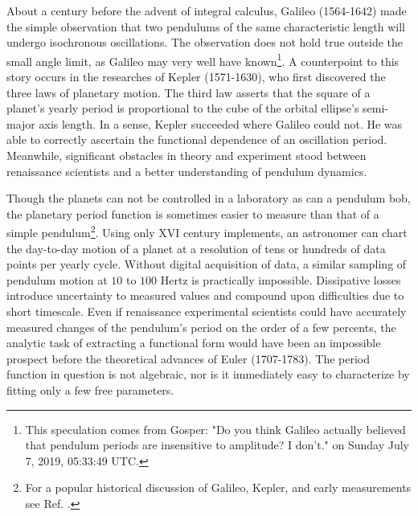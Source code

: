 \documentclass[nofootinbib,preprint]{revtex4-1}
\begin{document}
About a century before the advent of 
integral calculus, Galileo (1564-1642) made the simple observation that two 
pendulums of the same characteristic length will undergo isochronous 
oscillations. The observation does not hold true outside the small angle limit, 
as Galileo may very well have known\footnote{This speculation comes from Gosper:
"Do you think Galileo actually believed that pendulum periods are insensitive to 
amplitude?  I don't." on Sunday July 7, 2019, 05:33:49 UTC.}. A counterpoint to this 
story occurs in the researches of Kepler (1571-1630), who first discovered the three 
laws of planetary motion. The third law asserts that the square of a planet's yearly 
period is proportional to the cube of the orbital ellipse's semi-major axis length. 
In a sense, Kepler succeeded where Galileo could not. He was able to correctly 
ascertain the functional dependence of an oscillation period. Meanwhile, significant 
obstacles in theory and experiment stood between renaissance scientists and a better 
understanding of pendulum dynamics.  

Though the planets can not be controlled in a laboratory as can a pendulum bob, the 
planetary period function is sometimes easier to measure than that of a simple pendulum\footnote{For 
a popular historical discussion of Galileo, Kepler, and early measurements see Ref. \cite{STROGATZ2019}.}. 
Using only XVI century implements, an astronomer can chart the day-to-day motion of a 
planet at a resolution of tens or hundreds of data points per yearly cycle. 
Without digital acquisition of data, a similar sampling of pendulum motion at $10$ to 
$100$ Hertz is practically impossible. Dissipative losses introduce uncertainty to 
measured values and compound upon difficulties due to short timescale. Even if renaissance 
experimental scientists could have accurately measured changes of the pendulum's period on 
the order of a few percents, the analytic task of extracting a functional form would have been 
an impossible prospect before the theoretical advances of Euler (1707-1783). The period 
function in question is not algebraic, nor is it immediately easy to characterize by fitting 
only a few free parameters. 
\end{document}
